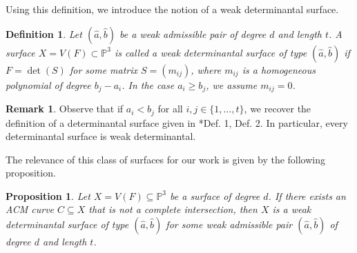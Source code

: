 \documentclass[12pt,reqno]{amsart}
\theoremstyle{plain}
\newtheorem{prop}[theorem]{Proposition}
\newtheorem{defi}[theorem]{Definition}
\theoremstyle{definition}
\newtheorem{rmk}[theorem]{Remark}
\theoremstyle{remark}
\theoremstyle{definition}
\newcommand{\PP}{\mathds{P}}
\newcommand{\PPP}{\PP^{3}}
\begin{document}
Using this definition, we introduce the notion of a weak determinantal surface.

\begin{defi} \label{defaddpair}
Let $(\hat{a}, \hat{b})$ be a weak admissible pair of degree $d$ and length $t$. A surface $X=V(F)\subset\PP^3$ is called a \textit{weak determinantal surface} of type $(\hat{a}, \hat{b})$ if $F=\det(S)$ for some matrix $S=(m_{ij})$, where $m_{ij}$ is a homogeneous polynomial of degree $b_j-a_i$. In the case $a_i\geq b_j$, we assume $m_{ij}=0$.
\end{defi}

\begin{rmk}
Observe that if $a_i<b_j$ for all $i,j\in\{1,\ldots,t\}$, we recover the definition of a determinantal surface given in \cite{LLV}*{Def. 1, Def. 2}. In particular, every determinantal surface is weak determinantal.
\end{rmk}

The relevance of this class of surfaces for our work is given by the following proposition.

\begin{prop} \label{propnotdet}
Let $X=V(F)\subseteq \PPP$ be a surface of degree $d$. If there exists an ACM curve $C\subseteq X$ that is not a complete intersection, then $X$ is a weak determinantal surface of type $(\hat{a}, \hat{b})$ for some weak admissible pair $(\hat{a}, \hat{b})$ of degree $d$ and length $t$.
\end{prop}
\end{document}
